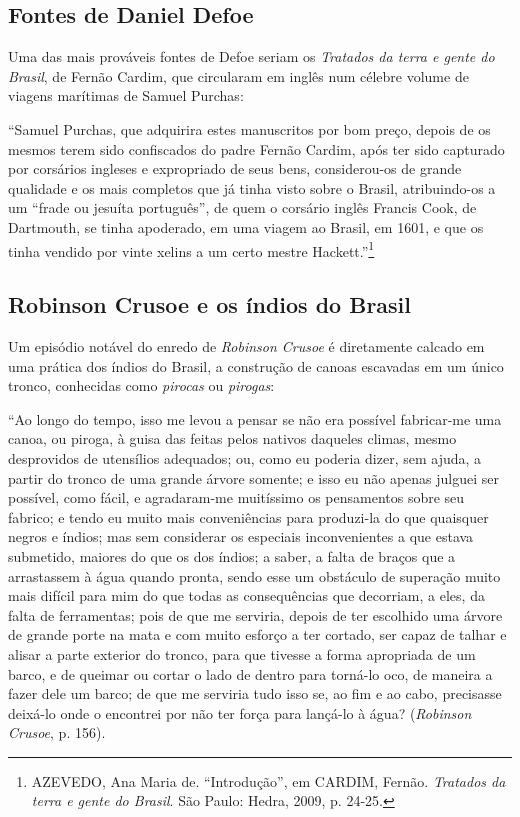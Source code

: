 \documentclass[12pt]{extarticle}
\begin{document}
\subsection{Fontes de Daniel Defoe}

Uma das mais prováveis fontes de Defoe seriam os \emph{Tratados da terra
e gente do Brasil}, de Fernão Cardim, que circularam em inglês num
célebre volume de viagens marítimas de Samuel Purchas:

``Samuel Purchas, que adquirira estes manuscritos por bom preço, depois
de os mesmos terem sido confiscados do padre Fernão Cardim, após ter
sido capturado por corsários ingleses e expropriado de seus bens,
considerou-os de grande qualidade e os mais completos que já tinha visto
sobre o Brasil, atribuindo-os a um ``frade ou jesuíta português'', de
quem o corsário inglês Francis Cook, de Dartmouth, se tinha apoderado,
em uma viagem ao Brasil, em 1601, e que os tinha vendido por vinte
xelins a um certo mestre Hackett.''\footnote{AZEVEDO, Ana Maria de.
  ``Introdução'', em CARDIM, Fernão. \emph{Tratados da terra e gente do
  Brasil}. São Paulo: Hedra, 2009, p. 24-25.}

\subsection{Robinson Crusoe e os índios do Brasil}

Um episódio notável do enredo de \emph{Robinson Crusoe} é diretamente
calcado em uma prática dos índios do Brasil, a construção de canoas
escavadas em um único tronco, conhecidas como \emph{pirocas} ou
\emph{pirogas}:

``Ao longo do tempo, isso me levou a pensar se não era possível
fabricar-me uma canoa, ou piroga, à guisa das feitas pelos nativos
daqueles climas, mesmo desprovidos de utensílios adequados; ou, como eu
poderia dizer, sem ajuda, a partir do tronco de uma grande árvore
somente; e isso eu não apenas julguei ser possível, como fácil, e
agradaram-me muitíssimo os pensamentos sobre seu fabrico; e tendo eu
muito mais conveniências para produzi-la do que quaisquer negros e
índios; mas sem considerar os especiais inconvenientes a que estava
submetido, maiores do que os dos índios; a saber, a falta de braços que
a arrastassem à água quando pronta, sendo esse um obstáculo de superação
muito mais difícil para mim do que todas as consequências que decorriam,
a eles, da falta de ferramentas; pois de que me serviria, depois de ter
escolhido uma árvore de grande porte na mata e com muito esforço a ter
cortado, ser capaz de talhar e alisar a parte exterior do tronco, para
que tivesse a forma apropriada de um barco, e de queimar ou cortar o
lado de dentro para torná-lo oco, de maneira a fazer dele um barco; de
que me serviria tudo isso se, ao fim e ao cabo, precisasse deixá-lo onde
o encontrei por não ter força para lançá-lo à água? (\emph{Robinson
Crusoe}, p. 156).
\end{document}
